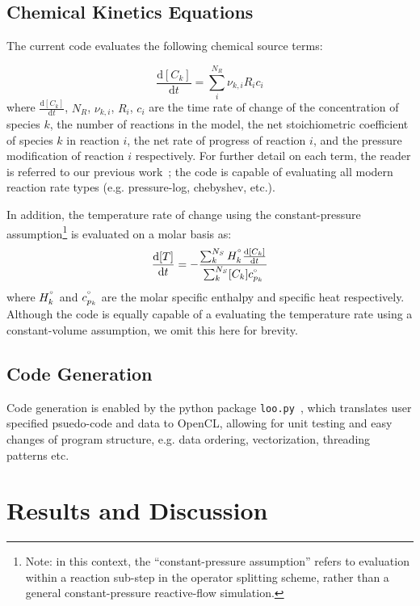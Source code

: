 \documentclass[12pt]{ussci}
\begin{document}
\subsection{Chemical Kinetics Equations}
The current code evaluates the following chemical source terms:

\begin{equation}
\frac{\text{d}[C_k]}{\text{d}t} = \sum_{i}^{N_R} \nu_{k,i} R_i c_i
\end{equation}
where $\frac{\text{d}[C_k]}{\text{d}t}$, $N_R$, $\nu_{k,i}$, ${R_i}$, $c_i$ are the time rate of change of the concentration of species $k$, the number of reactions in the model, the net stoichiometric coefficient of species $k$ in reaction $i$, the net rate of progress of reaction $i$, and the pressure modification of reaction $i$ respectively.
For further detail on each term, the reader is referred to our previous work~\cite{Niemeyer:2016aa}; the code is capable of evaluating all modern reaction rate types (e.g. pressure-log, chebyshev, etc.).

In addition, the temperature rate of change using the constant-pressure assumption\footnote{Note: in this context, the ``constant-pressure assumption'' refers to evaluation within a reaction sub-step in the operator splitting scheme, rather than a general constant-pressure reactive-flow simulation.} is evaluated on a molar basis as:
\begin{equation}
\frac{\text{d}[T]}{\text{d}t} = -\frac{\sum_{k}^{N_S} H^{\degree}_k \frac{\text{d}[C_k]}{\text{d}t}}{\sum_{k}^{N_S} [C_k] c_{p_k}^{\degree}}
\end{equation}
where $H^{\degree}_k$ and $c_{p_k}^{\degree}$ are the molar specific enthalpy and specific heat respectively.
Although the code is equally capable of a evaluating the temperature rate using a constant-volume assumption, we omit this here for brevity.

\subsection{Code Generation}
Code generation is enabled by the python package \texttt{loo.py}~\cite{kloeckner_loopy_2014}, which translates user specified psuedo-code and data to OpenCL, allowing for unit testing and easy changes of program structure, e.g. data ordering, vectorization, threading patterns etc.

\section{Results and Discussion}
\end{document}
